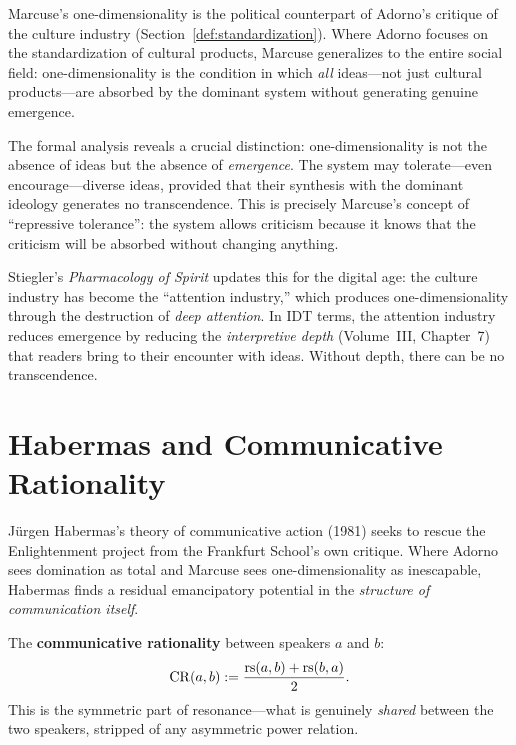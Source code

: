 \begin{interpretation}
Marcuse's one-dimensionality is the political counterpart of Adorno's critique
of the culture industry (Section~\ref{def:standardization}). Where Adorno
focuses on the standardization of cultural products, Marcuse generalizes to
the entire social field: one-dimensionality is the condition in which
\emph{all} ideas---not just cultural products---are absorbed by the dominant
system without generating genuine emergence.

The formal analysis reveals a crucial distinction: one-dimensionality is not
the absence of ideas but the absence of \emph{emergence}. The system may
tolerate---even encourage---diverse ideas, provided that their synthesis with
the dominant ideology generates no transcendence. This is precisely Marcuse's
concept of ``repressive tolerance'': the system allows criticism because it
knows that the criticism will be absorbed without changing anything.

Stiegler's \textit{Pharmacology of Spirit} updates this for the digital age:
the culture industry has become the ``attention industry,'' which produces
one-dimensionality through the destruction of \emph{deep attention}. In IDT
terms, the attention industry reduces emergence by reducing the
\emph{interpretive depth} (Volume~III, Chapter~7) that readers bring to their
encounter with ideas. Without depth, there can be no transcendence.
\end{interpretation}

\section{Habermas and Communicative Rationality}

J\"urgen Habermas's theory of communicative action (1981) seeks to rescue the
Enlightenment project from the Frankfurt School's own critique. Where Adorno
sees domination as total and Marcuse sees one-dimensionality as inescapable,
Habermas finds a residual emancipatory potential in the \emph{structure of
communication itself}.

\begin{definition}
\label{def:communicative-rationality}
The \textbf{communicative rationality} between speakers $a$ and $b$:
\[
\mathrm{CR}(a, b) := \frac{\mathrm{rs}(a, b) + \mathrm{rs}(b, a)}{2}.
\]
This is the symmetric part of resonance---what is genuinely \emph{shared}
between the two speakers, stripped of any asymmetric power relation.
\end{definition}

